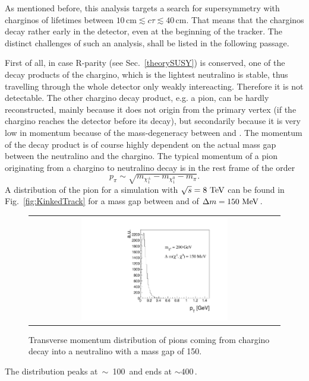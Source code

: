 As mentioned before, this analysis targets a search for supersymmetry with charginos of lifetimes between $10\,\text{cm} \lesssim c\tau \lesssim  40\,\text{cm}$.
That means that the charginos decay rather early in the detector, even at the beginning of the tracker. 
The distinct challenges of such an analysis, shall be listed in the following passage.

First of all, in case R-parity (see Sec.~\ref{theorySUSY}) is conserved, one of the decay products of the chargino, which is the lightest neutralino \chiO is stable, thus travelling through the whole detector only weakly intereacting.
Therefore it is not detectable. 
The other chargino decay product, e.g. a pion, can be hardly reconstructed, mainly because it does not origin from the primary vertex (if the chargino reaches the detector before its decay), 
but secondarily because it is very low in momentum because of the mass-degeneracy between \chipm and \chiO.
The momentum of the decay product is of course highly dependent on the actual mass gap between the neutralino and the chargino.
The typical momentum of a pion originating from a chargino to neutralino decay is in the \chipm rest frame of the order 
$$p_{\pi}\sim \sqrt{m_{\chi^{\pm}_1}-m_{\chi^{0}_1}-m_{\pi}}.$$
A \pt distribution of the pion for a simulation with $\sqrt{s} = 8\,\,\text{Te}\kern-0.06667em\text{V}$ can be found in Fig.~\ref{fig:KinkedTrack} for a mass gap between \chipm and \chiO of $\Delta m=150\, \,\text{Me}\kern-0.06667em\text{V}$.
\begin{figure}[!b]
  \centering 
  \begin{tabular}{c}
    \includegraphics[width=0.6\textwidth]{figures/analysis/ptOfPions.pdf}
  \end{tabular}
  \caption{Transverse momentum distribution of pions coming from chargino decay into a neutralino with a mass gap of 150\mev.}
  \label{fig:ptOfPions}
\end{figure} 
The \pt distribution peaks \mbox{at $\sim$ 100\,\mev} and ends at \mbox{\pt $\sim 400\,$\mev}.
